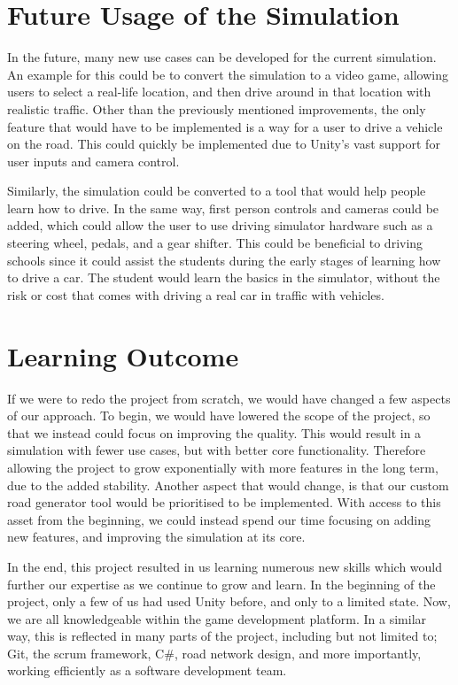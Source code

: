     \section{Future Usage of the Simulation}
        In the future, many new use cases can be developed for the current simulation. An example for this could be to convert the simulation to a video game, allowing users to select a real-life location, and then drive around in that location with realistic traffic. Other than the previously mentioned improvements, the only feature that would have to be implemented is a way for a user to drive a vehicle on the road. This could quickly be implemented due to Unity's vast support for user inputs and camera control.

        Similarly, the simulation could be converted to a tool that would help people learn how to drive. In the same way, first person controls and cameras could be added, which could allow the user to use driving simulator hardware such as a steering wheel, pedals, and a gear shifter. This could be beneficial to driving schools since it could assist the students during the early stages of learning how to drive a car. The student would learn the basics in the simulator, without the risk or cost that comes with driving a real car in traffic with vehicles.
    
    \section{Learning Outcome}
        If we were to redo the project from scratch, we would have changed a few aspects of our approach. To begin, we would have lowered the scope of the project, so that we instead could focus on improving the quality. This would result in a simulation with fewer use cases, but with better core functionality. Therefore allowing the project to grow exponentially with more features in the long term, due to the added stability. Another aspect that would change, is that our custom road generator tool would be prioritised to be implemented. With access to this asset from the beginning, we could instead spend our time focusing on adding new features, and improving the simulation at its core.

        In the end, this project resulted in us learning numerous new skills which would further our expertise as we continue to grow and learn. In the beginning of the project, only a few of us had used Unity before, and only to a limited state. Now, we are all knowledgeable within the game development platform. In a similar way, this is reflected in many parts of the project, including but not limited to; Git, the scrum framework, C\#, road network design, and more importantly, working efficiently as a software development team.
